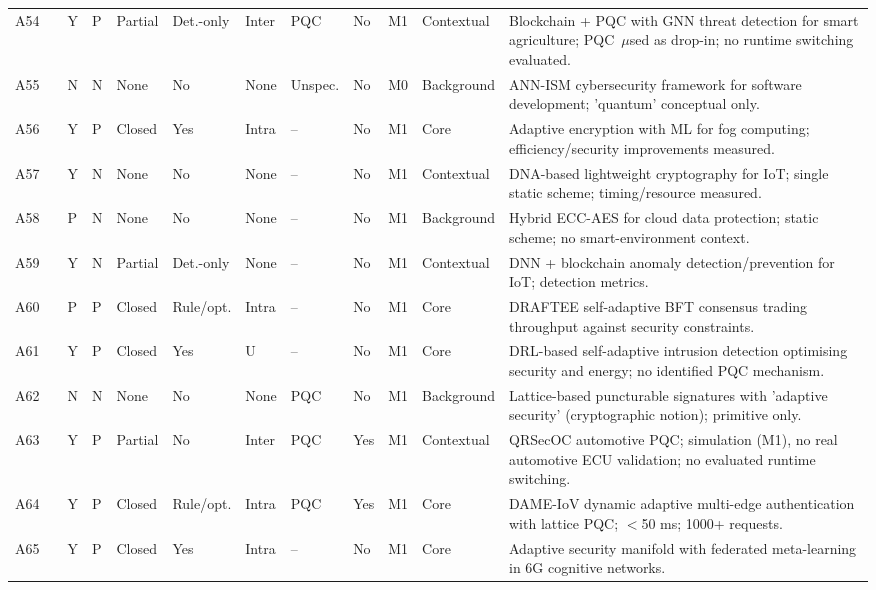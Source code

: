 {\begin{longtable}{p{0.43cm}p{0.8cm}p{0.3cm}p{0.4cm}p{0.8cm}p{0.75cm}p{0.65cm}p{0.8cm}p{0.8cm}p{0.45cm}p{1.1cm}p{4.95cm}}
A54 & \cite{Alharbi2025} & Y & P & Partial & Det.-only & Inter & PQC & No & M1 & Contextual & Blockchain + PQC with GNN threat detection for smart agriculture; PQC~$\mu$sed as drop-in; no runtime switching evaluated. \\
A55 & \cite{Khan2025} & N & N & None & No & None & Unspec. & No & M0 & Background & ANN-ISM cybersecurity framework for software development; 'quantum' conceptual only. \\
A56 & \cite{Kumar2025} & Y & P & Closed & Yes & Intra & -- & No & M1 & Core & Adaptive encryption with ML for fog computing; efficiency/security improvements measured. \\
A57 & \cite{Aqeel2025} & Y & N & None & No & None & -- & No & M1 & Contextual & DNA-based lightweight cryptography for IoT; single static scheme; timing/resource measured. \\
A58 & \cite{Selvi2025} & P & N & None & No & None & -- & No & M1 & Background & Hybrid ECC-AES for cloud data protection; static scheme; no smart-environment context. \\
A59 & \cite{AR2025} & Y & N & Partial & Det.-only & None & -- & No & M1 & Contextual & DNN + blockchain anomaly detection/prevention for IoT; detection metrics. \\
A60 & \cite{Leduc2025} & P & P & Closed & Rule/opt. & Intra & -- & No & M1 & Core & DRAFTEE self-adaptive BFT consensus trading throughput against security constraints. \\
A61 & \cite{Jamshidi2025} & Y & P & Closed & Yes & U & -- & No & M1 & Core & DRL-based self-adaptive intrusion detection optimising security and energy; no identified PQC mechanism. \\
A62 & \cite{10.1145/3759179.3760358} & N & N & None & No & None & PQC & No & M1 & Background & Lattice-based puncturable signatures with 'adaptive security' (cryptographic notion); primitive only. \\
A63 & \cite{Nsour2025_QRSecOC} & Y & P & Partial & No & Inter & PQC & Yes & M1 & Contextual & QRSecOC automotive PQC; simulation (M1), no real automotive ECU validation; no evaluated runtime switching. \\
A64 & \cite{RASHEED2025100933} & Y & P & Closed & Rule/opt. & Intra & PQC & Yes & M1 & Core & DAME-IoV dynamic adaptive multi-edge authentication with lattice PQC; $<$50 ms; 1000+ requests. \\
A65 & \cite{11104087} & Y & P & Closed & Yes & Intra & -- & No & M1 & Core & Adaptive security manifold with federated meta-learning in 6G cognitive networks. \\

\end{longtable}}
